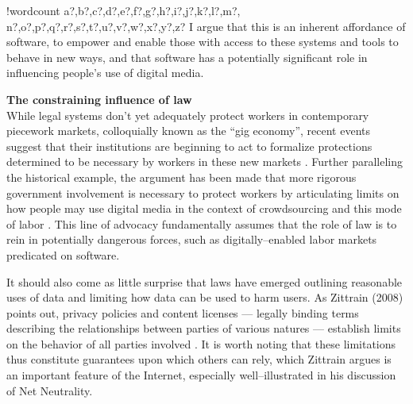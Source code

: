 \documentclass[11pt]{article}
\newcounter{words}
\newenvironment{counted}{%
  \setcounter{words}{0}
  \SearchList!{wordcount}{\stepcounter{words}}
    {a?,b?,c?,d?,e?,f?,g?,h?,i?,j?,k?,l?,m?,
    n?,o?,p?,q?,r?,s?,t?,u?,v?,w?,x?,y?,z?}
  \UndoBoundary{'}
  \SearchOrder{p;}}{%
  \StopSearching}
\newcommand{\sectitle}[1]{\textbf{#1}\\}
\begin{document}
\begin{counted}
I argue that this is an inherent affordance of software,
to empower and enable those with access to these systems and tools to behave in new ways,
and that software has a potentially significant role in influencing people's use of digital media.



\sectitle{The constraining influence of law}
While legal systems don't yet adequately protect workers in contemporary piecework markets,
colloquially known as the ``gig economy'',
recent events suggest that their institutions are beginning to act to formalize protections determined to be necessary by workers in these new markets
\cite{fedsUber,uberSuit}.
Further paralleling the historical example,
the argument has been made that more rigorous government involvement is necessary to protect workers
by articulating limits on how people may use digital media in the context of crowdsourcing and this mode of labor
\cite{fixingChaos}.
This line of advocacy fundamentally assumes that the role of law is to rein in potentially dangerous forces, such as digitally--enabled labor markets predicated on software.



It should also come as little surprise that
laws have emerged outlining reasonable uses of data
and limiting how data can be used to harm users.
As Zittrain (2008) points out, privacy policies and content licenses
--- legally binding terms describing the relationships between parties of various natures ---
establish limits on the behavior of all parties involved
\cite{zittrain2008future}.
It is worth noting that these limitations thus constitute guarantees upon which others can rely,
which Zittrain argues is an important feature of the Internet,
especially well--illustrated in his discussion of Net Neutrality.


\end{counted}
\end{document}
